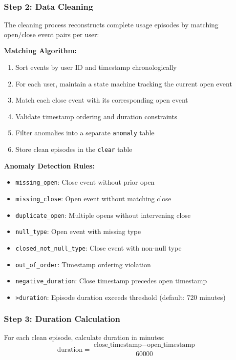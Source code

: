 \documentclass[12pt,a4paper]{article}
\begin{document}
\subsubsection{Step 2: Data Cleaning}
The cleaning process reconstructs complete usage episodes by matching open/close event pairs per user:

\textbf{Matching Algorithm:}
\begin{enumerate}
    \item Sort events by user ID and timestamp chronologically
    \item For each user, maintain a state machine tracking the current open event
    \item Match each close event with its corresponding open event
    \item Validate timestamp ordering and duration constraints
    \item Filter anomalies into a separate \texttt{anomaly} table
    \item Store clean episodes in the \texttt{clear} table
\end{enumerate}

\textbf{Anomaly Detection Rules:}
\begin{itemize}
    \item \texttt{missing\_open}: Close event without prior open
    \item \texttt{missing\_close}: Open event without matching close
    \item \texttt{duplicate\_open}: Multiple opens without intervening close
    \item \texttt{null\_type}: Open event with missing type
    \item \texttt{closed\_not\_null\_type}: Close event with non-null type
    \item \texttt{out\_of\_order}: Timestamp ordering violation
    \item \texttt{negative\_duration}: Close timestamp precedes open timestamp
    \item \texttt{>duration}: Episode duration exceeds threshold (default: 720 minutes)
\end{itemize}

\subsubsection{Step 3: Duration Calculation}
For each clean episode, calculate duration in minutes:
\begin{equation}
    \text{duration} = \frac{\text{close\_timestamp} - \text{open\_timestamp}}{60000}
\end{equation}
\end{document}

